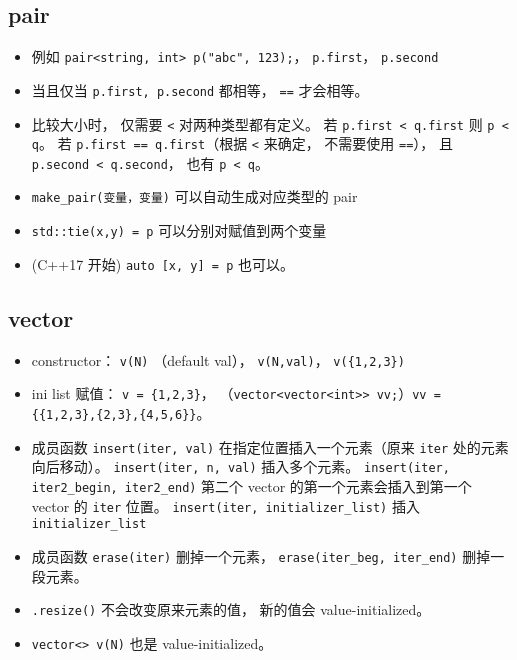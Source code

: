 
\begin{issues}
\issueDraft
\end{issues}

\subsection{pair}
\begin{itemize}
\item 例如 \verb|pair<string, int> p("abc", 123);|， \verb|p.first|， \verb|p.second|
\item 当且仅当 \verb|p.first, p.second| 都相等， \verb|==| 才会相等。
\item 比较大小时， 仅需要 \verb|<| 对两种类型都有定义。 若 \verb|p.first < q.first| 则 \verb|p < q|。 若 \verb|p.first == q.first|（根据 \verb|<| 来确定， 不需要使用 \verb|==|）， 且 \verb|p.second < q.second|， 也有 \verb|p < q|。
\item \verb|make_pair(变量，变量)| 可以自动生成对应类型的 pair
\item \verb|std::tie(x,y) = p| 可以分别对赋值到两个变量
\item (C++17 开始) \verb|auto [x, y] = p| 也可以。
\end{itemize}

\subsection{vector}
\begin{itemize}
\item constructor： \verb|v(N)| （default val）， \verb|v(N,val)|， \verb|v({1,2,3})|
\item ini list 赋值： \verb|v = {1,2,3}|， （\verb|vector<vector<int>> vv;|）\verb|vv = {{1,2,3},{2,3},{4,5,6}}|。
\item 成员函数 \verb|insert(iter, val)| 在指定位置插入一个元素（原来 \verb|iter| 处的元素向后移动）。 \verb|insert(iter, n, val)| 插入多个元素。 \verb|insert(iter, iter2_begin, iter2_end)| 第二个 vector 的第一个元素会插入到第一个 vector 的 \verb|iter| 位置。 \verb|insert(iter, initializer_list)| 插入 \verb|initializer_list|
\item 成员函数 \verb|erase(iter)| 删掉一个元素， \verb|erase(iter_beg, iter_end)| 删掉一段元素。
\item \verb|.resize()| 不会改变原来元素的值， 新的值会 value-initialized。
\item \verb|vector<> v(N)| 也是 value-initialized。
\end{itemize}

